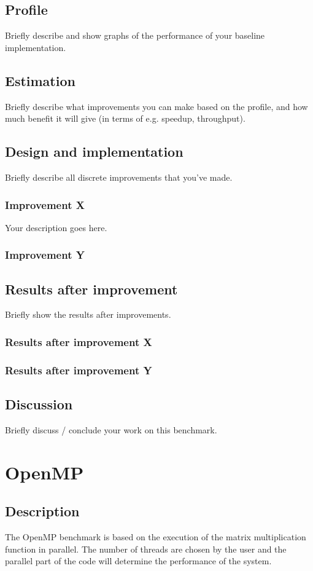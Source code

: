 \documentclass[twocolumn]{article}
\begin{document}
\subsection{Profile}
Briefly describe and show graphs of the performance of your baseline implementation.
\subsection{Estimation}
Briefly describe what improvements you can make based on the profile, and how much benefit it will give (in terms of e.g. speedup, throughput).
\subsection{Design and implementation}
Briefly describe all discrete improvements that you've made.
\subsubsection{Improvement X}
Your description goes here.
\subsubsection{Improvement Y}
\subsection{Results after improvement}
Briefly show the results after improvements.
\subsubsection{Results after improvement X}
\subsubsection{Results after improvement Y}
\subsection{Discussion}
Briefly discuss / conclude your work on this benchmark.

\section{OpenMP}
\subsection{Description}
The OpenMP benchmark is based on the execution of the matrix multiplication function in parallel. The number of threads are chosen by the user and the parallel part of the code will determine the performance of the system.
\end{document}
